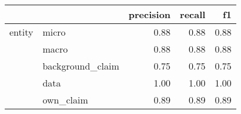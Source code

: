 \begin{tabular}{llrrr}
\toprule
       &           &  precision &  recall &   f1 \\
\midrule
entity & micro &       0.88 &    0.88 & 0.88 \\
       & macro &       0.88 &    0.88 & 0.88 \\
       & background\_claim &       0.75 &    0.75 & 0.75 \\
       & data &       1.00 &    1.00 & 1.00 \\
       & own\_claim &       0.89 &    0.89 & 0.89 \\
\bottomrule
\end{tabular}
